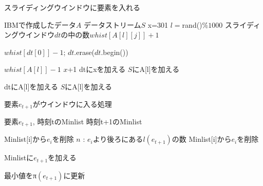 \documentclass{IEEEtran}
\begin{document}
 \begin{algorithm}
 \caption{スライディングウインドウに要素を入れる}
 \begin{algorithmic}[3]
 \renewcommand{\algorithmicrequire}{\textbf{Input:}}
 \renewcommand{\algorithmicensure}{\textbf{Output:}}
 \REQUIRE IBMで作成したデータ$A$
 \ENSURE  データストリーム$S$
 \STATE x=301
      \STATE $l=$rand()$\%1000$
           \STATE スライディングウインドウ$dt$の中の数$whist[A[l][j]]+1$
           
                \STATE $whist[dt[0]]-1$;
                \STATE $dt$.erase($dt$.begin())
           \ENDIF
           
                 \STATE $whist[A[l]]-1$
                  \STATE $x$+1
                  \STATE dtにxを加える
                 \STATE $S$にA[l]を加える
           \ENDIF
           
              \STATE dtにA[l]を加える
              \STATE $S$にA[l]を加える
           \ENDIF
      \ENDFOR
\ENDFOR
 
 \end{algorithmic} 
 \end{algorithm}
 
  \begin{algorithm}
 \caption{要素$e_{t+1}$がウインドウに入る処理}
 \begin{algorithmic}[1]
 \renewcommand{\algorithmicrequire}{\textbf{Input:}}
 \renewcommand{\algorithmicensure}{\textbf{Output:}}
 \REQUIRE 要素$e_{t+1}$, 時刻tのMinlist
 \ENSURE  時刻t+1のMinlist

  \STATE Minlist[i]から$e_i$を削除
  \ENDIF
   \STATE $n$ : $e_i$より後ろにある$l(e_{t+1})$の数
  \STATE Minlist[i]から$e_i$を削除
  \ENDIF
 \ENDFOR
 
 \STATE Minlistに$e_{t+1}$を加える
 
 \STATE 最小値をπ$(e_{t+1})$に更新
 \ENDIF
 
 \end{algorithmic} 
 \end{algorithm}
 
  
\end{document}
